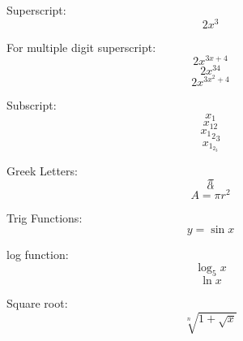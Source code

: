 \documentclass[11pt]{article}
\begin{document}
	Superscript: $$2x^3$$
	
	For multiple digit superscript: $$2x^{3 x+4}$$
	 $$2x^{34}$$ 
	$$2x^{3x^2+4}$$
	
	Subscript:$$x_1$$
	$$x_{12}$$
	$${{x_1}_2}_3$$
	$$x_{1_{2_3}}$$
	
	Greek Letters:
	$$\pi$$
	$$\alpha$$
	$$A=\pi r^2$$
	
	Trig Functions:
	$$y=\sin     x$$
	
	log function:
	$$\log_5x$$
	$$\ln x$$
	
	Square root:
	$$\sqrt[n]{1+\sqrt{x}}$$
\end{document}
